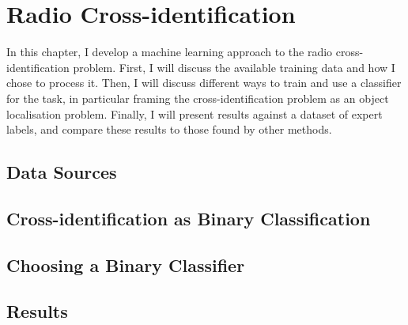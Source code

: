 \chapter{Radio Cross-identification}
\label{cha:passive-learning}

  In this chapter, I develop a machine learning approach to the radio cross-identification problem. First, I will discuss the available training data and how I chose to process it. Then, I will discuss different ways to train and use a classifier for the task, in particular framing the cross-identification problem as an object localisation problem. Finally, I will present results against a dataset of expert labels, and compare these results to those found by other methods.

\section{Data Sources}
\label{sec:data}

\section{Cross-identification as Binary Classification}
\label{sec:framing-as-classification}

\section{Choosing a Binary Classifier}
\label{sec:binary-classifier}

\section{Results}
\label{sec:passive-results}
